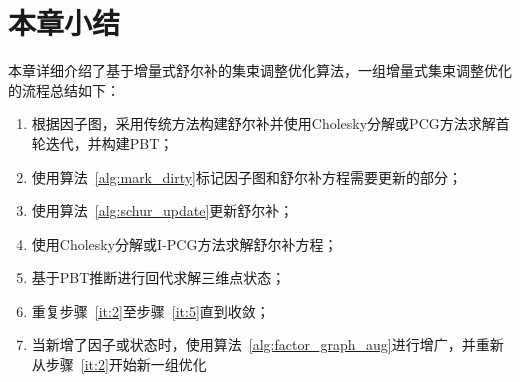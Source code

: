 \section{本章小结}

本章详细介绍了基于增量式舒尔补的集束调整优化算法，一组增量式集束调整优化的流程总结如下：
\begin{enumerate}
    \item 根据因子图，采用传统方法构建舒尔补并使用Cholesky分解或PCG方法求解首轮迭代，并构建PBT；
    \item\label{it:2} 使用算法~\ref{alg:mark_dirty}标记因子图和舒尔补方程需要更新的部分；
    \item\label{it:3} 使用算法~\ref{alg:schur_update}更新舒尔补；
    \item\label{it:4} 使用Cholesky分解或I-PCG方法求解舒尔补方程；
    \item\label{it:5} 基于PBT推断进行回代求解三维点状态；
    \item 重复步骤~\ref{it:2}至步骤~\ref{it:5}直到收敛；
    \item 当新增了因子或状态时，使用算法~\ref{alg:factor_graph_aug}进行增广，并重新从步骤~\ref{it:2}开始新一组优化
\end{enumerate}
